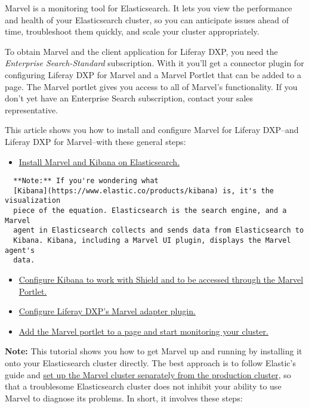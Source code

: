 Marvel is a monitoring tool for Elasticsearch. It lets you view the
performance and health of your Elasticsearch cluster, so you can
anticipate issues ahead of time, troubleshoot them quickly, and scale
your cluster appropriately.

To obtain Marvel and the client application for Liferay DXP, you need
the \emph{Enterprise Search-Standard} subscription. With it you'll get a
connector plugin for configuring Liferay DXP for Marvel and a Marvel
Portlet that can be added to a page. The Marvel portlet gives you access
to all of Marvel's functionality. If you don't yet have an Enterprise
Search subscription, contact your sales representative.

This article shows you how to install and configure Marvel for Liferay
DXP--and Liferay DXP for Marvel--with these general steps:

\begin{itemize}
\tightlist
\item
  \hyperref[installing-kibana-and-marvel]{Install Marvel and Kibana on
  Elasticsearch.}
\end{itemize}

\noindent\hrulefill

\begin{verbatim}
  **Note:** If you're wondering what
  [Kibana](https://www.elastic.co/products/kibana) is, it's the visualization
  piece of the equation. Elasticsearch is the search engine, and a Marvel
  agent in Elasticsearch collects and sends data from Elasticsearch to
  Kibana. Kibana, including a Marvel UI plugin, displays the Marvel agent's
  data.
\end{verbatim}

\noindent\hrulefill

\begin{itemize}
\item
  \hyperref[configuring-kibana-for-elasticsearch]{Configure Kibana to
  work with Shield and to be accessed through the Marvel Portlet.}
\item
  \hyperref[configuring-liferays-marvel-adapter]{Configure Liferay DXP's
  Marvel adapter plugin.}
\item
  \hyperref[accessing-marvels-ui-in-liferay]{Add the Marvel portlet to a
  page and start monitoring your cluster.}
\end{itemize}

\noindent\hrulefill

\textbf{Note:} This tutorial shows you how to get Marvel up and running
by installing it onto your Elasticsearch cluster directly. The best
approach is to follow Elastic's guide and
\href{https://www.elastic.co/guide/en/marvel/2.4/installing-marvel.html\#monitoring-cluster}{set
up the Marvel cluster separately from the production cluster}, so that a
troublesome Elasticsearch cluster does not inhibit your ability to use
Marvel to diagnose its problems. In short, it involves these steps:

